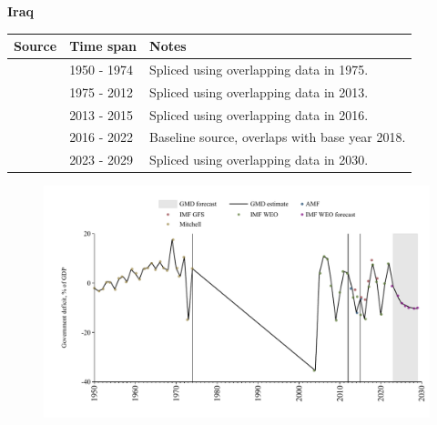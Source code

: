 \documentclass[12pt,a4paper,landscape]{article}
\begin{document}
\begin{adjustbox}{max totalsize={\paperwidth}{\paperheight},center}
\begin{minipage}[t][\textheight][t]{\textwidth}
\vspace*{0.5cm}
{}
\begin{center}
{\Large\bfseries Iraq}
\end{center}
\vspace{0.5cm}
\begin{table}[H]
\centering
\small
\begin{tabular}{|l|l|l|}
\hline
\textbf{Source} & \textbf{Time span} & \textbf{Notes} \\
\hline
\rowcolor{white}\cite{Mitchell}& 1950 - 1974 &Spliced using overlapping data in 1975.\\
\rowcolor{lightgray}\cite{IMF_WEO}& 1975 - 2012 &Spliced using overlapping data in 2013.\\
\rowcolor{white}\cite{AMF}& 2013 - 2015 &Spliced using overlapping data in 2016.\\
\rowcolor{lightgray}\cite{IMF_WEO}& 2016 - 2022 &Baseline source, overlaps with base year 2018.\\
\rowcolor{white}\cite{IMF_WEO_forecast}& 2023 - 2029 &Spliced using overlapping data in 2030.\\
\hline
\end{tabular}
\end{table}
\begin{figure}[H]
\centering
\includegraphics[width=\textwidth,height=0.6\textheight,keepaspectratio]{graphs/IRQ_govdef_GDP.pdf}
\end{figure}
\end{minipage}
\end{adjustbox}
\end{document}
